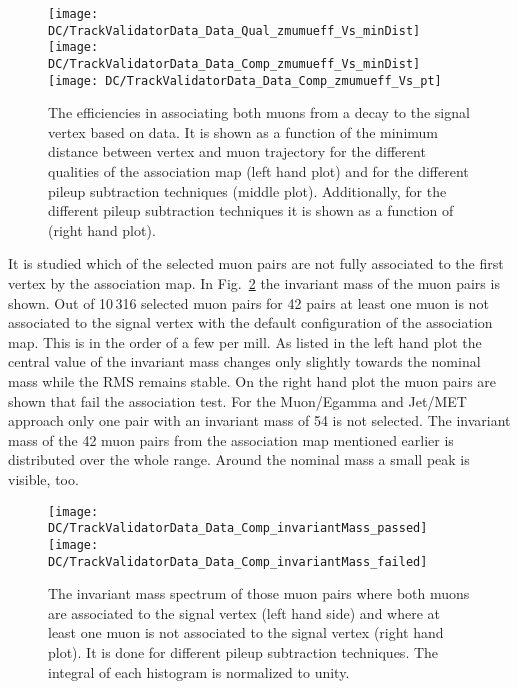 \begin{figure}[Ht]
  \centering
  \texttt{[image: DC/TrackValidatorData\_Data\_Qual\_zmumueff\_Vs\_minDist]}
  \texttt{[image: DC/TrackValidatorData\_Data\_Comp\_zmumueff\_Vs\_minDist]}
  \texttt{[image: DC/TrackValidatorData\_Data\_Comp\_zmumueff\_Vs\_pt]}
  \caption[Data based association efficiencies of the muon pairs coming from a \Zz decay of different qualities of the association map and different pileup subtraction techniques]{The efficiencies in associating both muons from a \Zz decay to the signal vertex based on data. It is shown as a function of the minimum distance between vertex and muon trajectory for the different qualities of the association map (left hand plot) and for the different pileup subtraction techniques (middle plot). Additionally, for the different pileup subtraction techniques it is shown as a function of \pt{} (right hand plot).  \label{plot:DCTVZmmEff}}
\end{figure}

It is studied which of the selected muon pairs are not fully associated to the first vertex by the association map. In Fig.~\ref{plot:DCTVZmmMass} the invariant mass of the muon pairs is shown. Out of 10\,316 selected muon pairs for 42 pairs at least one muon is not associated to the signal vertex with the default configuration of the association map. This is in the order of a few per mill. As listed in the left hand plot the central value of the invariant mass changes only slightly towards the nominal \Zz mass while the RMS remains stable. On the right hand plot the muon pairs are shown that fail the association test. For the Muon/Egamma and Jet/MET approach only one pair with an invariant mass of 54\GeV{} is not selected. The invariant mass of the 42 muon pairs from the association map mentioned earlier is distributed over the whole range. Around the nominal \Zz{} mass a small peak is visible, too.

\begin{figure}[Ht]
  \centering
  \texttt{[image: DC/TrackValidatorData\_Data\_Comp\_invariantMass\_passed]}
  \texttt{[image: DC/TrackValidatorData\_Data\_Comp\_invariantMass\_failed]}
  \caption[Invariant mass spectrum for muon pairs where the association of both muon passed or failed of different pileup subtraction techniques]{The invariant mass spectrum of those muon pairs where both muons are associated to the signal vertex (left hand side) and where at least one muon is not associated to the signal vertex (right hand plot). It is done for different pileup subtraction techniques. The integral of each histogram is normalized to unity. \label{plot:DCTVZmmMass}}
\end{figure}


